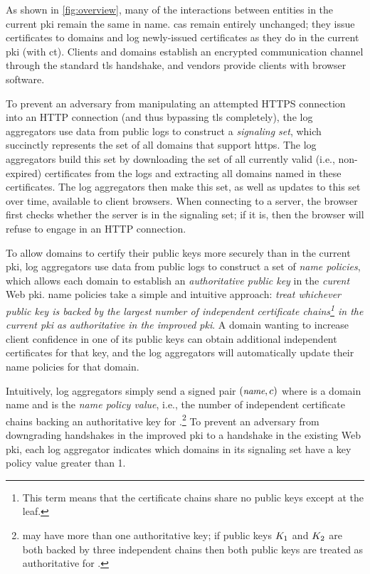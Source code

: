 As shown in \autoref{fig:overview}, many of the interactions between entities in
the current \ac{pki} remain the same in \ac{name}. \acp{ca} remain entirely unchanged;
they issue certificates
to domains and log newly-issued certificates as they do in the current \ac{pki}
(with \ac{ct}). Clients and domains establish an encrypted communication channel
through the standard \ac{tls} handshake, and vendors provide clients with browser
software.

To prevent an adversary from manipulating an attempted HTTPS connection into
an HTTP connection (and thus bypassing \ac{tls}
completely), the log aggregators use data from public logs to construct a
\emph{signaling set}, which succinctly represents the set of all domains that
support \ac{https}. The log aggregators build this set by downloading the set of
all currently valid (i.e., non-expired) certificates from the logs and
extracting all domains named in these certificates. The log aggregators then
make this set, as well as updates to this set over time, available to client
browsers.  When connecting to a server, the browser first checks whether
the server is in the signaling set; if it is, then the browser will refuse
to engage in an HTTP connection.

To allow domains to certify their public keys more securely than in the current
\ac{pki}, log aggregators use data from public logs to construct a set of
\emph{\ac{name} policies}, which allows each domain to establish an
\emph{authoritative public key} in the \emph{curent} Web \ac{pki}. \ac{name}
policies take a simple and intuitive approach: \emph{treat whichever public key
  is backed by the largest number of independent certificate chains\footnote{This term means
  that the certificate chains share no public keys except at the leaf.} in the
current \ac{pki} as authoritative in the improved \ac{pki}}. A domain wanting to
increase client confidence in one of its public keys can obtain additional 
independent certificates for that key, and the log aggregators will
automatically update their \ac{name} policies for that domain.

Intuitively, log aggregators simply send a signed pair $(\small{\emph{name}}, c)$
where \hostname is a domain name and \policy is the \emph{\ac{name} policy
  value}, i.e., the number of independent certificate chains backing an authoritative
  key for \hostname.\footnote{\hostname may have more than one authoritative
  key; if public keys $K_1$ and $K_2$ are both backed by three independent
chains then both public keys are treated as authoritative
for \hostname.} To prevent an adversary from downgrading handshakes in the
improved \ac{pki} to a handshake in the existing Web \ac{pki}, each log
aggregator indicates which domains in its signaling set have a key policy value
greater than 1.


